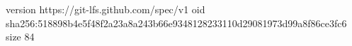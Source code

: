 version https://git-lfs.github.com/spec/v1
oid sha256:518898b4e5f48f2a23a8a243b66e9348128233110d29081973d99a8f86ce3fc6
size 84
